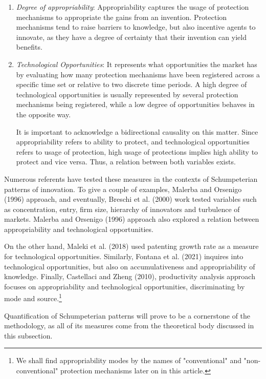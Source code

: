 \documentclass[12pt,a4paper]{article}
\begin{document}
\begin{enumerate}
	\item \textit{Degree of appropriability}: Appropriability captures the usage of protection mechanisms to appropriate the gains from an invention. Protection mechanisms tend to raise barriers to knowledge, but also incentive agents to innovate, as they have a degree of certainty that their invention can yield benefits. 
	
	\item \textit{Technological Opportunities}: It represents what opportunities the market has by evaluating how many protection mechanisms have been registered across a specific time set or relative to two discrete time periods. A high degree of technological opportunities is usually represented by several protection mechanisms being registered, while a low degree of opportunities behaves in the opposite way.
	
	It is important to acknowledge a bidirectional causality on this matter. Since appropriability refers to ability to protect, and technological opportunities refers to usage of protection, high usage of protections implies high ability to protect and vice versa. Thus, a relation between both variables exists.
\end{enumerate}

Numerous referents have tested these measures in the contexts of Schumpeterian patterns of innovation. To give a couple of examples, Malerba and Orsenigo (1996) approach, and eventually, Breschi et al. (2000) work tested variables such as concentration, entry, firm size, hierarchy of innovators and turbulence of markets. Malerba and Orsenigo (1996) approach also explored a relation between appropriability and technological opportunities.

On the other hand, Maleki et al. (2018) used patenting growth rate as a measure for technological opportunities. Similarly, Fontana et al. (2021) inquires into technological opportunities, but also on accumulativeness and appropriability of knowledge. Finally, Castellaci and Zheng (2010), productivity analysis approach focuses on appropriability and technological opportunities, discriminating by mode and source.\footnote{We shall find appropriability modes by the names of "conventional" and "non-conventional" protection mechanisms later on in this article.}

Quantification of Schumpeterian patterns will prove to be a cornerstone of the methodology, as all of its measures come from the theoretical body discussed in this subsection.
\end{document}
